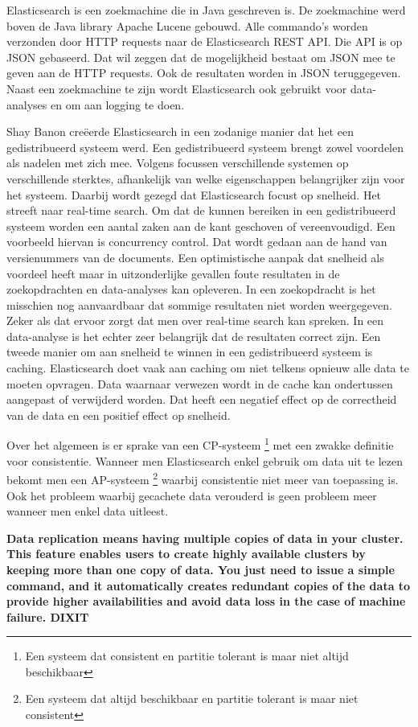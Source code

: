 Elasticsearch is een zoekmachine die in Java geschreven is. De zoekmachine werd boven de Java library Apache Lucene gebouwd. Alle commando's worden verzonden door HTTP requests naar de Elasticsearch REST API. Die API is op JSON gebaseerd. Dat wil zeggen dat de mogelijkheid bestaat om JSON mee te geven aan de HTTP requests. Ook de resultaten worden in JSON teruggegeven. Naast een zoekmachine te zijn wordt Elasticsearch ook gebruikt voor data-analyses en om aan logging te doen. 

Shay Banon creëerde Elasticsearch in een zodanige manier dat het een gedistribueerd systeem werd. Een gedistribueerd systeem brengt zowel voordelen als nadelen met zich mee. Volgens \textcite{Brasetvik2013s} focussen verschillende systemen op verschillende sterktes, afhankelijk van welke eigenschappen belangrijker zijn voor het systeem. Daarbij wordt gezegd dat Elasticsearch focust op snelheid. Het streeft naar real-time search. Om dat de kunnen bereiken in een gedistribueerd systeem worden een aantal zaken aan de kant geschoven of vereenvoudigd. Een voorbeeld hiervan is concurrency control. Dat wordt gedaan aan de hand van versienummers van de documents. Een optimistische aanpak dat snelheid als voordeel heeft maar in uitzonderlijke gevallen foute resultaten in de zoekopdrachten en data-analyses kan opleveren. In een zoekopdracht is het misschien nog aanvaardbaar dat sommige resultaten niet worden weergegeven. Zeker als dat ervoor zorgt dat men over real-time search kan spreken. In een data-analyse is het echter zeer belangrijk dat de resultaten correct zijn. Een tweede manier om aan snelheid te winnen in een gedistribueerd systeem is caching. Elasticsearch doet vaak aan caching om niet telkens opnieuw alle data te moeten opvragen. Data waarnaar verwezen wordt in de cache kan ondertussen aangepast of verwijderd worden. Dat heeft een negatief effect op de correctheid van de data en een positief effect op snelheid.

Over het algemeen is er sprake van een CP-systeem \footnote{Een systeem dat consistent en partitie tolerant is maar niet altijd beschikbaar} met een zwakke definitie voor consistentie. Wanneer men Elasticsearch enkel gebruik om data uit te lezen bekomt men een AP-systeem \footnote{Een systeem dat altijd beschikbaar en partitie tolerant is maar niet consistent} waarbij consistentie niet meer van toepassing is. Ook het probleem waarbij gecachete data verouderd is geen probleem meer wanneer men enkel data uitleest.

\textbf{Data replication means having multiple copies of data in your cluster. This feature enables users to create highly available clusters by keeping more than one copy of data. You just need to issue a simple command, and it automatically creates redundant copies of the data to provide higher availabilities and avoid data loss in the case of machine failure. DIXIT}

